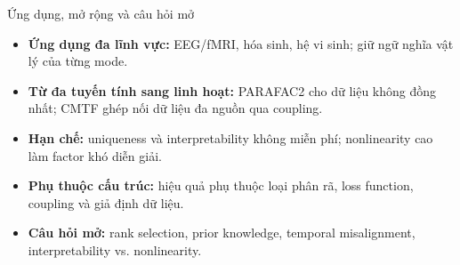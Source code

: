 \begin{frame}{Ứng dụng, mở rộng và câu hỏi mở}
\begin{itemize}
    \item \textbf{Ứng dụng đa lĩnh vực:} EEG/fMRI, hóa sinh, hệ vi sinh; giữ ngữ nghĩa vật lý của từng mode.
    \item \textbf{Từ đa tuyến tính sang linh hoạt:} PARAFAC2 cho dữ liệu không đồng nhất; CMTF ghép nối dữ liệu đa nguồn qua coupling.
    \item \textbf{Hạn chế:} uniqueness và interpretability không miễn phí; nonlinearity cao làm factor khó diễn giải.
    \item \textbf{Phụ thuộc cấu trúc:} hiệu quả phụ thuộc loại phân rã, loss function, coupling và giả định dữ liệu.
    \item \textbf{Câu hỏi mở:} rank selection, prior knowledge, temporal misalignment, interpretability vs. nonlinearity.
\end{itemize}
\end{frame}
